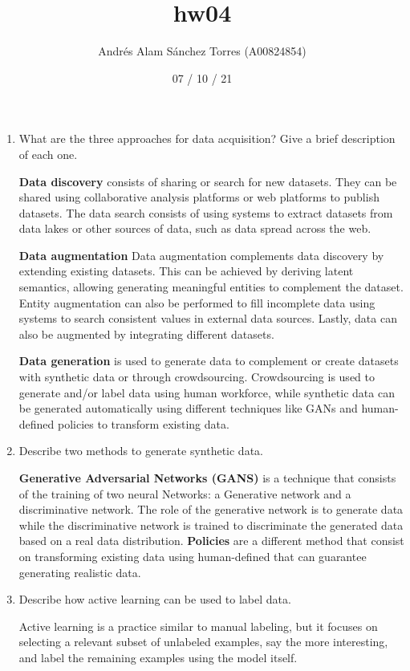 \documentclass[]{article}
\title{hw04}
\date{07 / 10 / 21}
\author{Andrés Alam Sánchez Torres (A00824854)}
\begin{document}
\maketitle

\begin{enumerate}
    \item What are the three approaches for data acquisition? Give a brief description of each one.

    \textbf{Data discovery}  consists of sharing or search for new datasets. They can be shared using 
    collaborative analysis platforms or web platforms to publish datasets. The data search consists of using 
    systems to extract datasets from data lakes or other sources of data, such as data spread across the web.\par
    \textbf{Data augmentation} Data augmentation complements data discovery by extending existing datasets. This 
    can be achieved by deriving latent semantics, allowing generating meaningful entities to complement the 
    dataset. Entity augmentation can also be performed to fill incomplete data using systems to search consistent 
    values in external data sources. Lastly, data can also be augmented by integrating different datasets. \par
    \textbf{Data generation} is used to generate data to complement or create datasets with synthetic data or through 
    crowdsourcing. Crowdsourcing is used to generate and/or label data using human workforce, while synthetic data
    can be generated automatically using different techniques like GANs and human-defined policies to transform 
    existing data.


    \item Describe two methods to generate synthetic data.
    
    \textbf{Generative Adversarial Networks (GANS)} is a technique that consists of the training of two neural Networks: a Generative
    network and a discriminative network. The role of the generative network is to generate data while the discriminative
    network is trained to discriminate the generated data based on a real data distribution. \textbf{Policies} are a different method that 
    consist on transforming existing data using human-defined that can guarantee generating realistic data.

    \item Describe how active learning can be used to label data.
    
    Active learning is a practice similar to manual labeling, but it focuses on selecting a relevant subset of unlabeled 
    examples, say the more interesting, and label the remaining examples using the model itself.


\end{enumerate}
\end{document}
